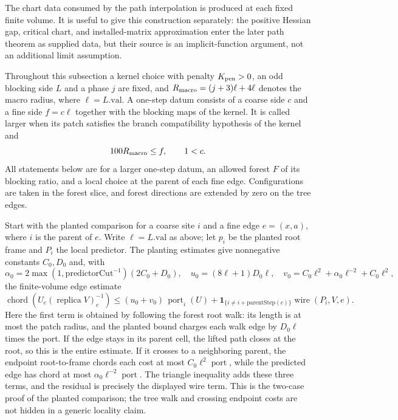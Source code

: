 The chart data consumed by the path interpolation is produced at each fixed
finite volume. It is useful to give this construction separately: the
positive Hessian gap, critical chart, and installed-matrix approximation
enter the later path theorem as supplied data, but their source is an
implicit-function argument, not an additional limit assumption.

Throughout this subsection a kernel choice with penalty
$K_{\rm pen}>0$, an odd blocking side $L$ and a phase $j$ are fixed, and
$R_{\rm macro}=(j+3)\ell+4\ell$ denotes the macro radius, where
$\ell=L.\mathrm{val}$. A one-step datum consists of a coarse side $c$
and a fine side $f=c\ell$ together with the blocking maps of the kernel.
It is called larger when its patch satisfies the branch compatibility
hypothesis of the kernel and
\[
 100R_{\rm macro}\le f,\qquad 1<c .
\]
All statements below are for a larger one-step datum, an allowed forest
$F$ of its blocking ratio, and a local choice at the parent of each fine
edge. Configurations are taken in the forest slice, and forest directions
are extended by zero on the tree edges.

Start with the planted comparison for a coarse site $i$ and a fine edge
$e=(x,a)$, where $i$ is the parent of $e$. Write $\ell=L.\mathrm{val}$ as above;
let $p_i$ be the planted root frame and $P_i$ the local predictor. The
planting estimates give nonnegative constants $C_0,D_0$ and, with
\[
 \alpha_0=2\max(1,\mathrm{predictorCut}^{-1})(2C_0+D_0),\quad
 u_0=(8\ell+1)D_0\ell,\quad
 v_0=C_0\ell^2+\alpha_0\ell^{-2}+C_0\ell^2,
\]
the finite-volume edge estimate
\[
 \operatorname{chord}\!\left(U_e(\operatorname{replica}V)_e^{-1}\right)
 \leq (u_0+v_0)\,\operatorname{port}_i(U)
       +\mathbf 1_{\{i\ne i+\mathrm{parentStep}(e)\}}
          \operatorname{wire}(P_i,V,e).
\]
Here the first term is obtained by following the forest root walk: its
length is at most the patch radius, and the planted bound charges each
walk edge by $D_0\ell$ times the port. If the edge stays in its parent cell,
the lifted path closes at the root, so this is the entire estimate. If it
crosses to a neighboring parent, the endpoint root-to-frame chords each
cost at most $C_0\ell^2\operatorname{port}$, while the predicted edge has
chord at most $\alpha_0\ell^{-2}\operatorname{port}$. The triangle inequality
adds these three terms, and the residual is precisely the displayed wire
term. This is the two-case proof of the planted comparison; the tree walk
and crossing endpoint costs are not hidden in a generic locality claim.

